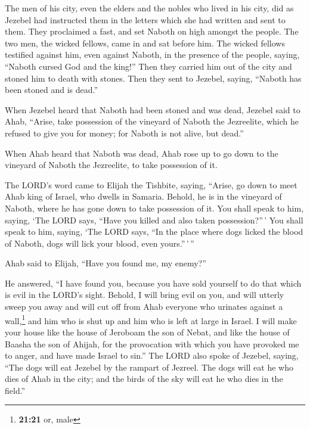  The men of his city, even the elders and the nobles who
lived in his city, did as Jezebel had instructed them in the letters
which she had written and sent to them.  They proclaimed
a fast, and set Naboth on high amongst the people.  The
two men, the wicked fellows, came in and sat before him. The wicked
fellows testified against him, even against Naboth, in the presence of
the people, saying, ``Naboth cursed God and the king!'' Then they
carried him out of the city and stoned him to death with stones.
 Then they sent to Jezebel, saying, ``Naboth has been
stoned and is dead.''

 When Jezebel heard that Naboth had been stoned and was
dead, Jezebel said to Ahab, ``Arise, take possession of the vineyard of
Naboth the Jezreelite, which he refused to give you for money; for
Naboth is not alive, but dead.''

 When Ahab heard that Naboth was dead, Ahab rose up to go
down to the vineyard of Naboth the Jezreelite, to take possession of it.

 The LORD's word came to Elijah the Tishbite, saying,
 ``Arise, go down to meet Ahab king of Israel, who dwells
in Samaria. Behold, he is in the vineyard of Naboth, where he has gone
down to take possession of it.  You shall speak to him,
saying, `The LORD says, ``Have you killed and also taken
possession?''\,' You shall speak to him, saying, `The LORD says, ``In
the place where dogs licked the blood of Naboth, dogs will lick your
blood, even yours.''\,'\,''

 Ahab said to Elijah, ``Have you found me, my enemy?''

He answered, ``I have found you, because you have sold yourself to do
that which is evil in the LORD's sight.  Behold, I will
bring evil on you, and will utterly sweep you away and will cut off from
Ahab everyone who urinates against a wall,\footnote{\textbf{21:21} or,
  male} and him who is shut up and him who is left at large in Israel.
 I will make your house like the house of Jeroboam the
son of Nebat, and like the house of Baasha the son of Ahijah, for the
provocation with which you have provoked me to anger, and have made
Israel to sin.''  The LORD also spoke of Jezebel, saying,
``The dogs will eat Jezebel by the rampart of Jezreel. 
The dogs will eat he who dies of Ahab in the city; and the birds of the
sky will eat he who dies in the field.''

